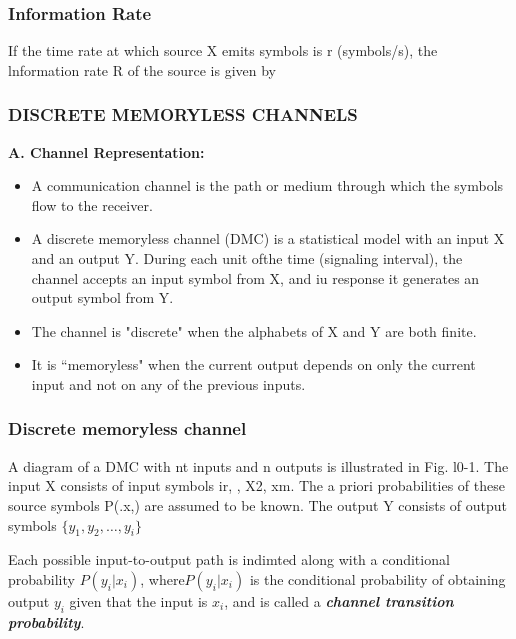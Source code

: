 





\begin{frame}
\frametitle{Information Rate}
If the time rate at which source X emits symbols is r (symbols/s), the lnformation rate R of the
source is given by


\end{frame}



\begin{frame} \frametitle{DISCRETE MEMORYLESS CHANNELS}
\textbf{A. Channel Representation:}\\
\begin{itemize}
\item A communication channel is the path or medium through which the symbols flow to the receiver. \item A discrete memoryless channel (DMC) is a statistical model with an input X and an output Y.
During each unit ofthe time (signaling interval), the channel accepts an input symbol from X, and iu
response it generates an output symbol from Y.\item  The channel is "discrete" when the alphabets of X and
Y are both finite.\item It is ``memoryless" when the current output depends on only the current input and
not on any of the previous inputs.\end{itemize}
\end{frame}

\begin{frame}
\frametitle{Discrete memoryless channel}
A diagram of a DMC with nt inputs and n outputs is illustrated in Fig. l0-1. The input X consists
of input symbols ir, , X2,   xm. 
The a priori probabilities of these source symbols P(.x,) are assumed to be known. 
The output Y consists of output symbols $\{y_1,y_2,\ldots, y_i \}$

Each possible input-to-output path is indimted along with a conditional probability $P(y_i|x_i)$, where$P(y_i|x_i)$  is the conditional probability of
obtaining output $y_i$ given that the input is $x_i$, and is called a \textbf{\emph{channel transition probability}}.
\end{frame}

